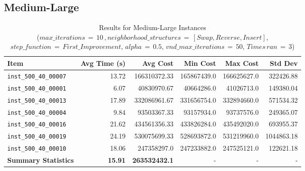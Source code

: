 \documentclass{article}
\begin{document}
\subsection*{Medium-Large}
\begin{table}[H]
	\centering
      \caption{Results for Medium-Large Instances \\($max\_iterations \,{=}\, 10\,, neighborhood\_structures \,{=}\, [Swap, Reverse, Insert]$, $step\_function \,{=}\, First\_Improvement$, $alpha \,{=}\, 0.5$, $vnd\_max\_iterations \,{=}\, 50$, $Times\, ran \,{=}\, 3$)}
    \hspace*{-2cm}
	\begin{tabular}{lrrrrr}
		\toprule
		\textbf{Item} & \textbf{Avg Time (s)} & \textbf{Avg Cost} & \textbf{Min Cost} & \textbf{Max Cost} & \textbf{Std Dev}\\
		\midrule
		\texttt{inst\_500\_40\_00007} & 13.72 & 166310372.33 & 165867439.0 & 166625627.0 & 322426.88 \\ \texttt{inst\_500\_40\_00001} & 6.07 & 40830970.67 & 40664286.0 & 41026713.0 & 149380.04 \\ \texttt{inst\_500\_40\_00013} & 17.89 & 332086961.67 & 331656754.0 & 332894660.0 & 571534.32 \\ \texttt{inst\_500\_40\_00004} & 9.84 & 93503367.33 & 93157934.0 & 93737576.0 & 249365.07 \\ \texttt{inst\_500\_40\_00016} & 21.62 & 434561356.33 & 433826284.0 & 435492020.0 & 693955.37 \\ \texttt{inst\_500\_40\_00019} & 24.19 & 530075699.33 & 528693872.0 & 531219960.0 & 1044863.18 \\ \texttt{inst\_500\_40\_00010} & 18.06 & 247358297.0 & 247233882.0 & 247525121.0 & 122621.18 \\ \midrule \textbf{Summary Statistics} & \textbf{15.91} & \textbf{263532432.1} & - & - & - \\
		\bottomrule
	\end{tabular}
	\label{tab:medium_large_performance_metrics_grasp}
\end{table}
\end{document}
